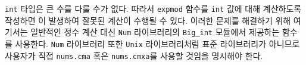 
 \texttt{int} 타입은 큰 수를 다룰 수가 없다. 따라서 \texttt{expmod}
함수를 \texttt{int} 값에 대해 계산하도록 작성하면 이
발생하여 잘못된 계산이 수행될 수 있다. 이러한 문제를 해결하기 위해 여기서는
일반적인 정수 계산 대신 \texttt{Num} 라이브러리의 \texttt{Big\_int} 모듈에서
제공하는 함수를 사용한다. \texttt{Num} 라이브러리 또한 \texttt{Unix}
라이브러리처럼 표준 라이브러리가 아니므로 사용자가 직접 \texttt{nums.cma} 혹은
\texttt{nums.cmxa}를 사용할 것임을 명시해야 한다.





